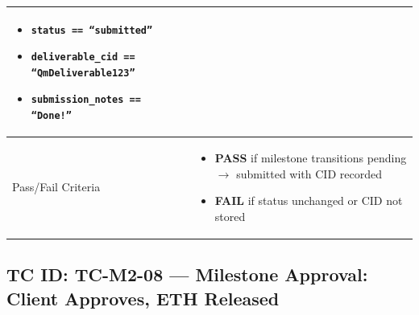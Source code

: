 \documentclass[12pt,a4paper]{article}
\newcommand{\passresult}{\textcolor{passgreen}{\textbf{PASS}}}
\newcommand{\failresult}{\textcolor{failred}{\textbf{FAIL}}}
\begin{document}
\begin{tabular}{|p{}|p{}|}
\begin{itemize}[nosep, leftmargin=*]
  \item \texttt{status == ``submitted''}
  \item \texttt{deliverable\_cid == ``QmDeliverable123''}
  \item \texttt{submission\_notes == ``Done!''}
\end{itemize} \\
\hline
Pass/Fail Criteria &
\begin{itemize}[nosep, leftmargin=*]
  \item \passresult{} if milestone transitions pending $\rightarrow$ submitted with CID recorded
  \item \failresult{} if status unchanged or CID not stored
\end{itemize} \\
\hline
\end{tabular}

\vspace{0.8cm}

\subsection{TC ID: TC-M2-08 --- Milestone Approval: Client Approves, ETH Released}
\end{document}
